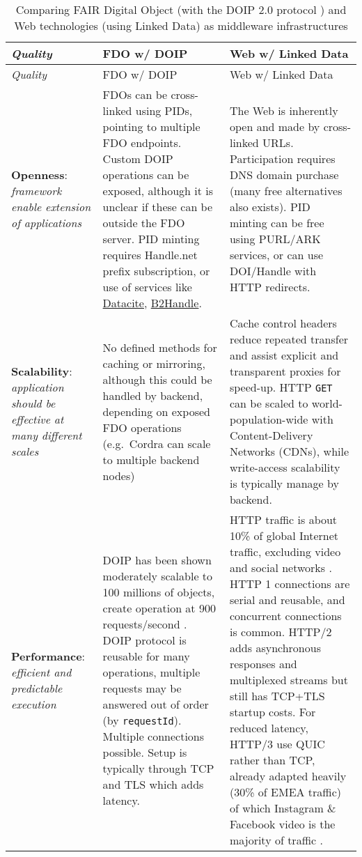 \begin{landscape}
\begin{small}
\begin{longtable}[]{@{}
  >{\raggedright\arraybackslash}p{}
  >{\raggedright\arraybackslash}p{}
  >{\raggedright\arraybackslash}p{}@{}}
	\caption[Comparing FAIR Digital Object and Web technologies as middleware infrastructures]{Comparing FAIR Digital Object (with the DOIP 2.0 protocol \cite{13TcbsZF6}) and Web technologies (using Linked Data) as middleware infrastructures \cite{hRzcHhPD}
\label{ch3:fdo-web-middleware}}\tabularnewline
\toprule
\emph{Quality} & 
FDO w/ DOIP & 
Web w/ Linked Data \\
\midrule
\endfirsthead
\toprule
\emph{Quality} & 
FDO w/ DOIP & 
Web w/ Linked Data \\
\midrule
\endhead
\textbf{Openness}: \emph{framework enable extension of applications} & FDOs can be cross-linked using PIDs, pointing to multiple FDO endpoints. Custom DOIP operations can be exposed, although it is unclear if these can be outside the FDO server. PID minting requires Handle.net prefix subscription, or use of services like \href{https://datacite.org/}{Datacite}, \href{https://eudat.eu/services/userdoc/b2handle}{B2Handle}. & The Web is inherently open and made by cross-linked URLs. Participation requires DNS domain purchase (many free alternatives also exists). PID minting can be free using PURL/ARK services, or can use DOI/Handle with HTTP redirects. \\
\textbf{Scalability}: \emph{application should be effective at many different scales} & No defined methods for caching or mirroring, although this could be handled by backend, depending on exposed FDO operations (e.g.~Cordra can scale to multiple backend nodes) & Cache control headers reduce repeated transfer and assist explicit and transparent proxies for speed-up. HTTP \texttt{GET} can be scaled to world-population-wide with Content-Delivery Networks (CDNs), while write-access scalability is typically manage by backend. \\
\textbf{Performance}: \emph{efficient and predictable execution} & DOIP has been shown moderately scalable to 100 millions of objects, create operation at 900 requests/second . DOIP protocol is reusable for many operations, multiple requests may be answered out of order (by \texttt{requestId}). Multiple connections possible. Setup is typically through TCP and TLS which adds latency. & HTTP traffic is about 10\% of global Internet traffic, excluding video and social networks \cite{sandvineGlobalInternetPhenomena}. HTTP 1 connections are serial and reusable, and concurrent connections is common. HTTP/2 adds asynchronous responses and multiplexed streams \cite{rfc7540} but still has TCP+TLS startup costs. For reduced latency, HTTP/3 \cite{rfc9114} use QUIC \cite{rfc9000} rather than TCP, already adapted heavily (30\% of EMEA traffic) of which Instagram \& Facebook video is the majority of traffic \cite{joras2020}. \\

\end{longtable}
\end{small}
\end{landscape}
